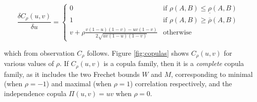 \documentclass[runningheads]{llncs}
\begin{document}
\begin{equation*}
\frac{\delta C_{\rho}(u,v)}{\delta u} = 
\begin{cases}
  0 & \text{if } \rho(A,B) \le \underline{\rho}(A,B) \\
  1 & \text{if } \rho(A,B) \ge \overline{\rho}(A,B) \\
  v + \rho \frac{v(1-u)(1-v) - uv(1-v)}{2\sqrt{uv(1-u)(1-v)}} & \text{otherwise}
\end{cases}

\end{equation*}

\noindent which from observation $C_{\rho}$ follows. Figure \ref{fig:copulas} shows $C_{\rho}(u,v)$ for various values of $\rho$. If $C_{\rho}(u,v)$ is a copula family, then it is a \textit{complete} copula family, as it includes the two Frechet bounds $W$ and $M$, corresponding to minimal (when $\rho = -1$) and maximal (when $\rho = 1$) correlation respectively, and the independence copula $\Pi(u,v) = uv$ when $\rho = 0$.
\end{document}
